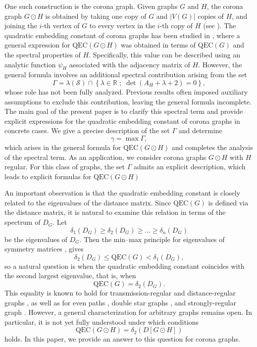 \documentclass[pdflatex,sn-mathphys-num]{sn-jnl}
\theoremstyle{thmstyleone}%
\theoremstyle{thmstyletwo}%
\theoremstyle{thmstylethree}%
\begin{document}
One such construction is the corona graph. 
Given graphs $G$ and $H$, the corona graph $G\odot H$ is obtained by 
taking one copy of $G$ and $|V(G)|$ copies of $H$, and joining the 
$i$-th vertex of $G$ to every vertex in the $i$-th copy of $H$ 
(see \cite{Frucht-Harary1970}). The quadratic embedding constant 
of corona graphs has been studied in \cite{Choudhury-Nandi2023,Ferdi-Baskoro-Obata-Santika2025}, where 
a general expression for $\mathrm{QEC}(G\odot H)$ was obtained in terms of 
$\mathrm{QEC}(G)$ and the spectral properties of $H$. Specifically, this value can 
be described using an analytic function $\psi_H$ associated with the adjacency matrix of $H$. However, the general formula involves an additional spectral contribution arising 
from the set
\[
\Gamma
=
\lambda(\mathcal{S})\cap\left\{
\lambda \in \mathbb{R} \; ; \; \det(A_H+\lambda+2)=0
\right\},
\]
whose role has not been fully analyzed. Previous results often imposed auxiliary 
assumptions to exclude this contribution, leaving the general formula incomplete. 
The main goal of the present paper is to clarify this spectral term and provide explicit 
expressions for the quadratic embedding constant of corona graphs in concrete cases. 
We give a precise description of the set $\Gamma$ and determine
\[
\gamma = \max \Gamma,
\]
which arises in the general formula for $\mathrm{QEC}(G\odot H)$ and completes the analysis of the spectral term. As an application, we consider corona graphs $G\odot H$ with $H$ regular. For this class of graphs, the set $\Gamma$ admits an explicit description, which leads to explicit formulas for $\mathrm{QEC}(G\odot H)$

An important observation is that the quadratic embedding constant is
closely related to the eigenvalues of the distance matrix. Since
$\mathrm{QEC}(G)$ is defined via the distance matrix, it is natural to
examine this relation in terms of the spectrum of $D_G$. Let
\[
\delta_1(D_G) \ge \delta_2(D_G) \ge \dots \ge \delta_n(D_G)
\]
be the eigenvalues of $D_G$. Then the min--max principle for eigenvalues of symmetry matrices \cite{Horn-Johnson2013}, gives
\[
\delta_2(D_G) \le \mathrm{QEC}(G) < \delta_1(D_G),
\]
so a natural question is when the quadratic embedding constant coincides with the 
second largest eigenvalue, that is, when
\[
\mathrm{QEC}(G) = \delta_2(D_G).
\]
This equality is known to hold for transmission-regular and distance-regular graphs 
\cite{Obata-Zakiyyah2018}, as well as for even paths \cite{Mlotkowski2022}, double star graphs 
\cite{Choudhury-Nandi2023}, and strongly-regular graph \cite{Obata2025}. However, a general characterization for arbitrary graphs 
remains open. In particular, it is not yet fully understood under which conditions
\[
\mathrm{QEC}(G\odot H) = \delta_2(D[G\odot H])
\]
holds. In this paper, we provide an answer to this question for corona graphs.
\end{document}
